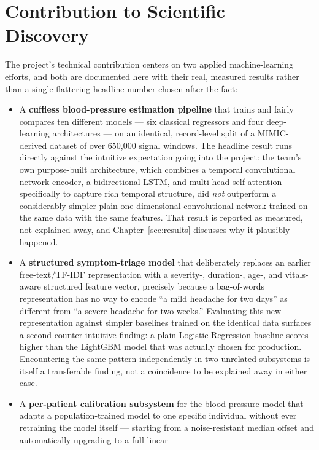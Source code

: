 \documentclass[12pt,a4paper]{report}
\begin{document}
\section{Contribution to Scientific Discovery}

The project's technical contribution centers on two applied machine-learning
efforts, and both are documented here with their real, measured results rather
than a single flattering headline number chosen after the fact:

\begin{itemize}[leftmargin=1.4em]
  \item A \textbf{cuffless blood-pressure estimation pipeline} that trains and
  fairly compares ten different models --- six classical regressors and four
  deep-learning architectures --- on an identical, record-level split of a
  MIMIC-derived dataset of over 650{,}000 signal windows. The headline result
  runs directly against the intuitive expectation going into the project: the
  team's own purpose-built architecture, which combines a temporal
  convolutional network encoder, a bidirectional LSTM, and multi-head
  self-attention specifically to capture rich temporal structure, did
  \emph{not} outperform a considerably simpler plain one-dimensional
  convolutional network trained on the same data with the same features. That
  result is reported as measured, not explained away, and Chapter~\ref{sec:results}
  discusses why it plausibly happened.
  \item A \textbf{structured symptom-triage model} that deliberately replaces an
  earlier free-text/TF-IDF representation with a severity-, duration-, age-,
  and vitals-aware structured feature vector, precisely because a bag-of-words
  representation has no way to encode ``a mild headache for two days'' as
  different from ``a severe headache for two weeks.'' Evaluating this new
  representation against simpler baselines trained on the identical data
  surfaces a second counter-intuitive finding: a plain Logistic Regression
  baseline scores higher than the LightGBM model that was actually chosen for
  production. Encountering the same pattern independently in two unrelated
  subsystems is itself a transferable finding, not a coincidence to be
  explained away in either case.
  \item A \textbf{per-patient calibration subsystem} for the blood-pressure
  model that adapts a population-trained model to one specific individual
  without ever retraining the model itself --- starting from a
  noise-resistant median offset and automatically upgrading to a full linear

\end{itemize}
\end{document}
